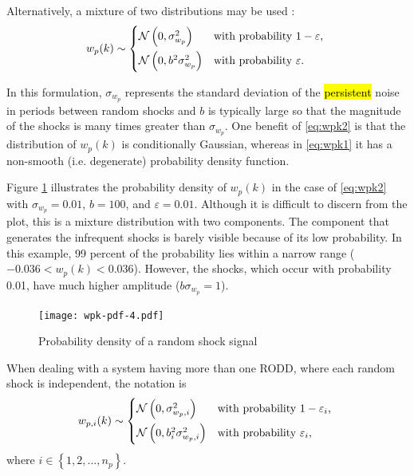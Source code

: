 Alternatively, a mixture of two distributions may be used \citep{robertson_detection_1995}:
\begin{equation} \label{eq:wpk2}
w_p(k) \sim 
	\begin{cases*}
		\mathcal{N}\left(0, \sigma_{w_p}^2\right) & with probability $1-\varepsilon$, \\
		\mathcal{N}\left(0, b^2\sigma_{w_p}^2\right) & with probability $\varepsilon$.
	\end{cases*}
\end{equation}
%
%

In this formulation, $\sigma_{w_p}$ represents the standard deviation of the \hl{persistent} noise in periods between random shocks and $b$ is typically large so that the magnitude of the shocks is many times greater than $\sigma_{w_p}$. One benefit of \eqref{eq:wpk2} is that the distribution of $w_p(k)$ is conditionally Gaussian, whereas in \eqref{eq:wpk1} it has a non-smooth (i.e. degenerate) probability density function.

Figure \ref{fig:wpk-pdf} illustrates the probability density of $w_p(k)$ in the case of \eqref{eq:wpk2} with $\sigma_{w_p}=0.01$, $b=100$, and $\varepsilon=0.01$. Although it is difficult to discern from the plot, this is a mixture distribution with two components. The component that generates the infrequent shocks is barely visible because of its low probability. In this example, 99 percent of the probability lies within a narrow range ($-0.036 < w_p(k) < 0.036$). However, the shocks, which occur with probability 0.01, have much higher amplitude ($b\sigma_{w_p}=1$).

\begin{figure}[ht]
	\centering
	\texttt{[image: wpk-pdf-4.pdf]}
	\caption{Probability density of a random shock signal}
	\label{fig:wpk-pdf}
\end{figure}

When dealing with a system having more than one \gls{RODD}, where each random shock is independent, the notation is
\begin{equation} \label{eq:wpik2}
	w_{p,i}(k) \sim 
	\begin{cases*}
		\mathcal{N}\left(0, \sigma_{w_p,i}^2\right) & with probability $1-\varepsilon_i$, \\
		\mathcal{N}\left(0, b_i^2\sigma_{w_p,i}^2\right) & with probability $\varepsilon_i$,
	\end{cases*}
\end{equation}
where $i \in \left\{1, 2, ..., n_p\right\}$.
%

